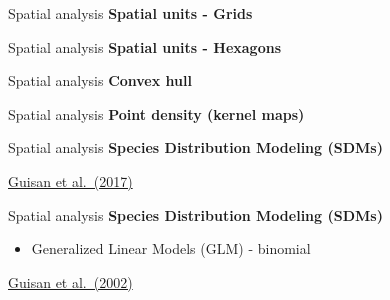 \documentclass[
  ignorenonframetext,
]{beamer}
\providecommand{\tightlist}{%
  \setlength{\itemsep}{0pt}\setlength{\parskip}{0pt}}\usepackage{longtable,booktabs,array}
\begin{document}
\begin{frame}{Spatial analysis}
\label{spatial-analysis}
\textbf{Spatial units - Grids}
\end{frame}

\begin{frame}{Spatial analysis}
\label{spatial-analysis-1}
\textbf{Spatial units - Hexagons}
\end{frame}

\begin{frame}{Spatial analysis}
\label{spatial-analysis-2}
\textbf{Convex hull}
\end{frame}

\begin{frame}{Spatial analysis}
\label{spatial-analysis-3}
\textbf{Point density (kernel maps)}
\end{frame}

\begin{frame}{Spatial analysis}
\label{spatial-analysis-4}
\textbf{Species Distribution Modeling (SDMs)}

\href{https://www.cambridge.org/br/academic/subjects/life-sciences/ecology-and-conservation/habitat-suitability-and-distribution-models-applications-r}{Guisan
et al.~(2017)}
\end{frame}

\begin{frame}{Spatial analysis}
\label{spatial-analysis-5}
\textbf{Species Distribution Modeling (SDMs)}

\begin{itemize}
\tightlist
\item
  Generalized Linear Models (GLM) - binomial
\end{itemize}

\href{https://linkinghub.elsevier.com/retrieve/pii/S0304380002002041}{Guisan
et al.~(2002)}
\end{frame}
\end{document}
